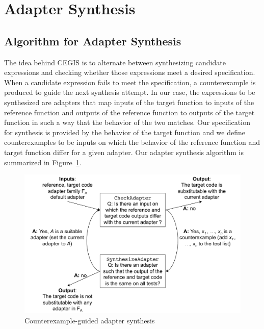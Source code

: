 \section{Adapter Synthesis}
\label{sec:adapter_synthesis}
%
\subsection{Algorithm for Adapter Synthesis}
%
The idea behind CEGIS is to alternate between synthesizing candidate expressions and checking whether those expressions meet a desired specification. 
%
When a candidate expression fails to meet the specification, a counterexample is produced to guide the next synthesis attempt.
%
In our case, the expressions to be synthesized are adapters that map inputs of the target function to inputs of the reference function and outputs of the reference function to outputs of the target function in such a way that the behavior of the two matches. 
%
Our specification for synthesis is provided by the behavior of the target function and we define counterexamples to be inputs on which the behavior of the reference function and target function differ for a given adapter.
%
Our adapter synthesis algorithm is summarized in Figure~\ref{fig:adapter_synthesis}.
%
\begin{figure}[]
\centering
\includegraphics[scale=0.42]{chapters/adapter_synthesis/figures/adapter_synthesis_diagram_v3}
\caption{Counterexample-guided adapter synthesis}
\label{fig:adapter_synthesis}
\end{figure}
%
%
